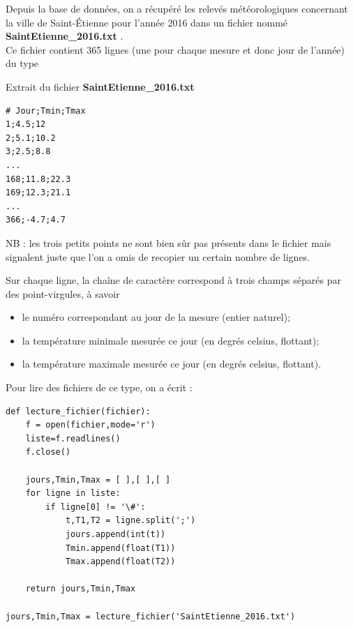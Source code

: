 \documentclass[10pt,fleqn]{article} %
\begin{document}
Depuis la base de données, on a récupéré les 
relevés météorologiques  concernant la ville de Saint-Étienne pour l'année 2016 dans
 un fichier nommé \textbf{SaintEtienne\_2016.txt} .\\
  Ce fichier contient 365 lignes (une pour chaque mesure et donc jour de l'année) du 
type 

\begin{exemple}
Extrait du fichier \textbf{SaintEtienne\_2016.txt}
\begin{verbatim}
# Jour;Tmin;Tmax
1;4.5;12
2;5.1;10.2
3;2.5;8.8
...
168;11.8;22.3
169;12.3;21.1
...
366;-4.7;4.7
\end{verbatim}

NB : les trois petits points ne sont bien sûr pas présents dans 
le fichier mais signalent juste que l'on a omis de recopier un certain nombre 
de lignes.
\end{exemple}


Sur chaque ligne, la chaîne de caractère correspond à trois champs séparés par des point-virgules, à savoir
	\begin{itemize}
		\item	le numéro correspondant au jour de la mesure (entier naturel);
		\item	la température minimale mesurée ce jour (en degrés celsius, flottant);
		\item	la température maximale mesurée ce jour (en degrés celsius, flottant).
	\end{itemize}


Pour lire des fichiers de ce type,  on a écrit  :
 \begin{py}
\begin{lstlisting}
def lecture_fichier(fichier):
    f = open(fichier,mode='r')
    liste=f.readlines()
    f.close()
    
    jours,Tmin,Tmax = [ ],[ ],[ ]
    for ligne in liste:
        if ligne[0] != '\#':
            t,T1,T2 = ligne.split(';')
            jours.append(int(t))
            Tmin.append(float(T1))
            Tmax.append(float(T2))
    
    return jours,Tmin,Tmax

jours,Tmin,Tmax = lecture_fichier('SaintEtienne_2016.txt')
\end{lstlisting}
\end{py}

%
%
%
\end{document}
